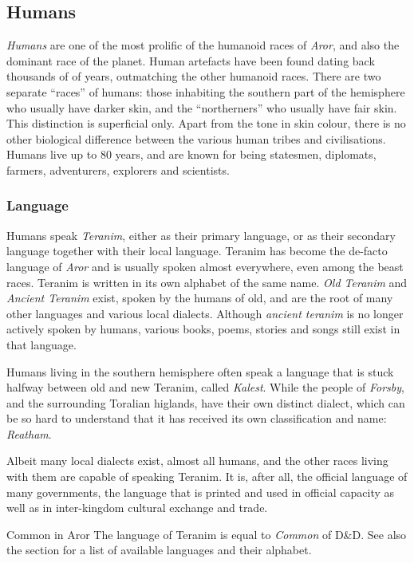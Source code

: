 \subsection{Humans}
\label{sec:Humans}

\emph{Humans} are one of the most prolific of the humanoid races of
\emph{Aror}, and also the dominant race of the planet. Human artefacts have
been found dating back thousands of of years, outmatching the other humanoid
races. There are two separate ``races'' of humans: those inhabiting the
southern part of the hemisphere who usually have darker skin, and the
``northerners'' who usually have fair skin. This distinction is superficial
only. Apart from the tone in skin colour, there is no other biological
difference between the various human tribes and civilisations. Humans live up
to 80 years, and are known for being statesmen, diplomats, farmers,
adventurers, explorers and scientists.

\subsubsection{Language}

Humans speak \emph{Teranim}, either as their primary language, or as their
secondary language together with their local language. Teranim has become the
de-facto language of \emph{Aror} and is usually spoken almost everywhere, even
among the beast races. Teranim is written in its own alphabet of the same
name. \emph{Old Teranim} and \emph{Ancient Teranim} exist, spoken by the
humans of old, and are the root of many other languages and various local
dialects. Although \emph{ancient teranim} is no longer actively spoken by
humans, various books, poems, stories and songs still exist in that language.

Humans living in the southern hemisphere often speak a language that is stuck
halfway between old and new Teranim, called \emph{Kalest}. While the people of
\emph{Forsby}, and the surrounding Toralian higlands, have their own distinct
dialect, which can be so hard to understand that it has received its own
classification and name: \emph{Reatham}.

Albeit many local dialects exist, almost all humans, and the other races
living with them are capable of speaking Teranim. It is, after all, the
official language of many governments, the language that is printed and used
in official capacity as well as in inter-kingdom cultural exchange and trade.

\begin{35e}{Common in Aror}
  The language of Teranim is equal to \emph{Common} of D\&D. See also
  the  section for a list of available languages
  and their alphabet.
\end{35e}


